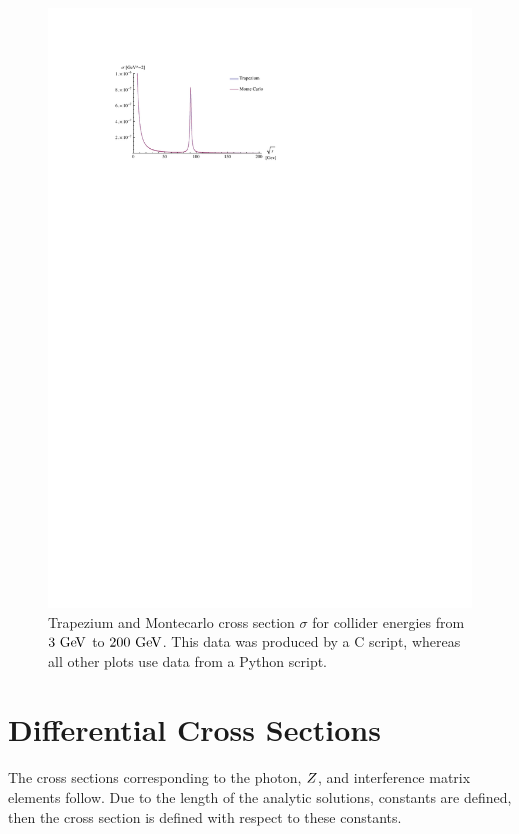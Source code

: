 \documentclass[]{article}
\begin{document}
\begin{figure}[H]
	\vspace{10pt}
	\hspace*{-0.1\textwidth}
	\centering
	\includegraphics[width=1.2\textwidth]{c_both}
	\caption{Trapezium and Montecarlo cross section $\sigma$ for collider energies from $3\GeV$ to $200\GeV$. This data was produced by a C script, whereas all other plots use data from a Python script.}
	\label{fig:cboth}
\end{figure}

\newpage

\appendix
\section{Differential Cross Sections}\label{app:differentials}

The cross sections corresponding to the photon, $Z $, and interference matrix elements follow. Due to the length of the analytic solutions, constants are defined, then the cross section is defined with respect to these constants.
\end{document}
